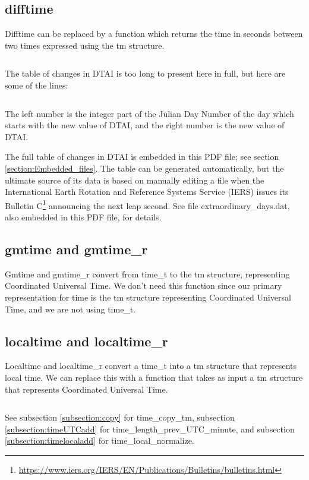 \documentclass[letterpaper,twoside]{article}
\begin{document}
\subsection{difftime}
\label{subsection:difftime}
Difftime can be replaced by a function which returns the time in seconds
between two times expressed using the {\ttfamily tm} structure.
\inputminted[firstline=37]{c}{time_diff.c}
The table of changes in DTAI is too long to present here in full,
but here are some of the lines:
\inputminted[firstline=46880,lastline=46908]{c}{dtai_table.tab}
The left number is the integer part of the Julian Day Number of the day
which starts with the new value of DTAI, and the right number is the new
value of DTAI.

The full table of changes in DTAI is embedded in this PDF file;
see section \ref{section:Embedded_files}.
The table can be generated automatically\citep{JBS_001}, but the ultimate
source of its data is based on manually editing a file when the
International Earth Rotation and Reference Systems Service (IERS)
issues its Bulletin
C\footnote{\url{https://www.iers.org/IERS/EN/Publications/Bulletins/bulletins.html}}
announcing the next leap second.  See file
{\ttfamily extraordinary\_days.dat}, also embedded in this PDF file,
for details.

\subsection{gmtime and gmtime\_r}
Gmtime and gmtime\_r convert from {\ttfamily time\_t} to
the {\ttfamily tm} structure,
representing Coordinated Universal Time.  We don't
need this function since our primary representation for time is the
{\ttfamily tm} structure representing Coordinated Universal Time,
and we are not using {\ttfamily time\_t}.

\subsection{localtime and localtime\_r}
\label{subsection:localtime}
Localtime and localtime\_r convert a {\ttfamily time\_t} into
a {\ttfamily tm} structure that
represents local time.  We can replace this with a function that takes
as input a {\ttfamily tm} structure that represents Coordinated Universal Time.
\inputminted[firstline=32]{c}{time_utc_to_local.c}
See subsection \ref{subsection:copy} for time\_copy\_tm,
subsection \ref{subsection:timeUTCadd} for
time\_\-length\_\-prev\_\-UTC\_\-minute,
and subsection \ref{subsection:timelocaladd} for time\_local\_normalize.
\end{document}
